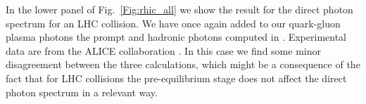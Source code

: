 \documentclass[aps,prc,a4paper,nofootinbib,
preprintnumbers,superscriptaddress,twocolumn,showpacs,showkeys]{revtex4}
\begin{document}
In the lower panel of Fig.~\ref{Fig:rhic_all} we show the result for the direct photon spectrum for an LHC collision.
We have once again added to our quark-gluon plasma photons the prompt and hadronic photons
computed in \cite{Linnyk:2015tha}. Experimental data are from the ALICE collaboration \cite{Adam:2015lda}.
In this case we find some minor disagreement between the three calculations,
which might be a consequence of the fact that for LHC collisions
the pre-equilibrium stage does not affect the direct photon spectrum in a relevant way. 

%
%
%
\end{document}

